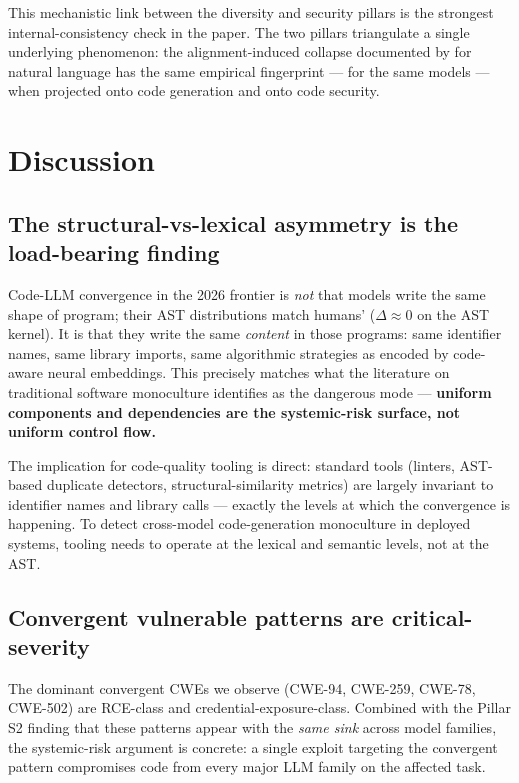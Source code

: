 \documentclass{article}
\begin{document}
This mechanistic link between the diversity and security pillars is the
strongest internal-consistency check in the paper. The two pillars
triangulate a single underlying phenomenon: the alignment-induced collapse
documented by \citet{jiang2025hivemind} for natural language has the same
empirical fingerprint --- for the same models --- when projected onto code
generation and onto code security.

\section{Discussion}
\label{sec:discussion}

\subsection{The structural-vs-lexical asymmetry is the load-bearing finding}

Code-LLM convergence in the 2026 frontier is \emph{not} that models write the
same shape of program; their AST distributions match humans'
($\Delta\approx 0$ on the AST kernel). It is that they write the same
\emph{content} in those programs: same identifier names, same library
imports, same algorithmic strategies as encoded by code-aware neural
embeddings. This precisely matches what the literature on traditional software
monoculture identifies as the dangerous mode --- \textbf{uniform components
and dependencies are the systemic-risk surface, not uniform control flow.}

The implication for code-quality tooling is direct: standard tools (linters,
AST-based duplicate detectors, structural-similarity metrics) are largely
invariant to identifier names and library calls --- exactly the levels at
which the convergence is happening. To detect cross-model code-generation
monoculture in deployed systems, tooling needs to operate at the lexical and
semantic levels, not at the AST.

\subsection{Convergent vulnerable patterns are critical-severity}

The dominant convergent CWEs we observe (CWE-94, CWE-259, CWE-78, CWE-502)
are RCE-class and credential-exposure-class. Combined with the Pillar S2
finding that these patterns appear with the \emph{same sink} across model
families, the systemic-risk argument is concrete: a single exploit targeting
the convergent pattern compromises code from every major LLM family on the
affected task.
\end{document}

